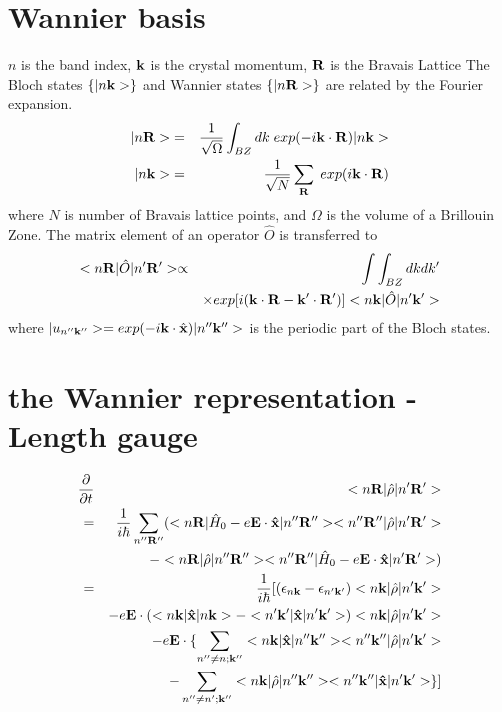 \documentclass[aps,prb,preprint]{revtex4-1}
\begin{document}
\begin{appendix}
\section{Wannier basis}
$n$ is the band index, $\bf k$ is the crystal momentum, ${\bf R} $ is the Bravais Lattice
The Bloch states $\{ |n{\bf k}> \}$ and Wannier states $\{ |n{\bf R}> \}$ are related by the Fourier expansion. 
\begin{eqnarray}
|n{\bf R}>&=&\frac{1}{\sqrt{\Omega}} \int_{BZ} dk \; exp(-i{\bf k} \cdot {\bf R})|n{\bf k}>\\
|n{\bf k}>&=&\frac{1}{\sqrt{N}} \sum_{\bf R} \; exp(i{\bf k} \cdot {\bf R}) 
\end{eqnarray} 
where $N$ is number of Bravais lattice points, and $\Omega$ is the volume of a Brillouin Zone. 
The matrix element of an operator $\hat{O}$ is transferred to 
\begin{eqnarray}
 < n{\bf R}| \hat{O} |n'{\bf R'}> \propto && \int \int_{BZ} dk dk'  \\
&& \times  exp[i ({\bf k} \cdot {\bf R}- {\bf k'} \cdot {\bf R'} ) ]< n{\bf k}| \hat{O} |n'{\bf k'}>  \nonumber 
\end{eqnarray} 
where $|u_{n''{\bf k''}}> = exp(-i{\bf k} \cdot \hat{\bf x}) |n''{\bf k''}>$ is the periodic part of the Bloch states.

\section{the Wannier representation -Length gauge }
\label{sec:WL}
\begin{eqnarray*}
\frac{ \partial }{\partial t } &&<n{\bf R}| \hat{\rho} |n'{\bf R'}> \\
= && \frac{1}{i \hbar}  \sum_{n''{\bf R''}} ( <n{\bf R}| \hat{H}_0 -e{\bf E} \cdot {\bf \hat{x}} |n''{\bf R''}><n''{\bf R''}| \hat{\rho} |n'{\bf R'}> \\
&&- <n{\bf R}| \hat{\rho} |n''{\bf R''}><n''{\bf R''}| \hat{H}_0 -e{\bf E} \cdot {\bf \hat{x}}  |n'{\bf R'}> )\\
= &&\frac{1}{i \hbar} [ (\epsilon_{n{\bf k}}-\epsilon_{n'{\bf k'}}) <n{\bf k}| \hat{\rho} |n'{\bf k'}> \\
&& -e{\bf E} \cdot(<n{\bf k}| {\bf \hat{x}} |n{\bf k}> - <n'{\bf k'}| {\bf \hat{x}} |n'{\bf k'}> ) <n{\bf k}| \hat{\rho} |n'{\bf k'}>\\ 
&&-e{\bf E} \cdot \{ \sum_{n'' \neq n; {\bf k''}} <n{\bf k}| {\bf \hat{x}} |n''{\bf k''}> <n''{\bf k''}| \hat{\rho} |n'{\bf k'}> \\
&&- \sum_{n'' \neq n'; {\bf k''}} <n{\bf k}| \hat{\rho} |n''{\bf k''}> <n''{\bf k''}| {\bf \hat{x}} |n'{\bf k'}> \} ]
\end{eqnarray*}


\end{appendix}
\end{document}

